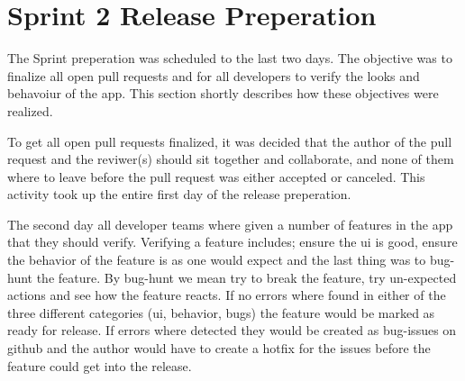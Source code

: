 \section{Sprint 2 Release Preperation}
The Sprint preperation was scheduled to the last two days. The objective was to finalize all open pull requests and for all developers to verify the looks and behavoiur of the app. This section shortly describes how these objectives were realized.

To get all open pull requests finalized, it was decided that the author of the pull request and the reviwer(s) should sit together and collaborate, and none of them where to leave before the pull request was either accepted or canceled. This activity took up the entire first day of the release preperation.

The second day all developer teams where given a number of features in the app that they should verify. Verifying a feature includes; ensure the \gls{ui} is good, ensure the behavior of the feature is as one would expect and the last thing was to bug-hunt the feature. By bug-hunt we mean try to break the feature, try un-expected actions and see how the feature reacts. If no errors where found in either of the three different categories (\gls{ui}, behavior, bugs) the feature would be marked as ready for release. If errors where detected they would be created as bug-issues on github and the author would have to create a hotfix for the issues before the feature could get into the release.
